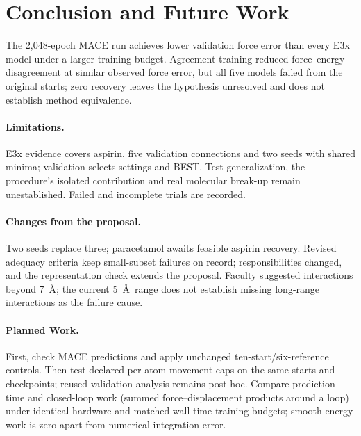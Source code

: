 \documentclass{article}
\begin{document}
\section{Conclusion and Future Work}
The 2,048-epoch MACE run achieves lower validation force error than every E3x model under a larger training budget. Agreement training reduced force--energy disagreement at similar observed force error, but all five models failed from the original starts; zero recovery leaves the hypothesis unresolved and does not establish method equivalence.
\paragraph{Limitations.} E3x evidence covers aspirin, five validation connections and two seeds with shared minima; validation selects settings and BEST. Test generalization, the procedure's isolated contribution and real molecular break-up remain unestablished. Failed and incomplete trials are recorded.

\paragraph{Changes from the proposal.}
Two seeds replace three; paracetamol awaits feasible aspirin recovery. Revised adequacy criteria keep small-subset failures on record; responsibilities changed, and the representation check extends the proposal. Faculty suggested interactions beyond 7~\AA; the current 5~\AA\ range does not establish missing long-range interactions as the failure cause.
\paragraph{Planned Work.} First, check MACE predictions and apply unchanged ten-start/six-reference controls. Then test declared per-atom movement caps on the same starts and checkpoints; reused-validation analysis remains post-hoc. Compare prediction time and closed-loop work (summed force--displacement products around a loop) under identical hardware and matched-wall-time training budgets; smooth-energy work is zero apart from numerical integration error.
\end{document}
